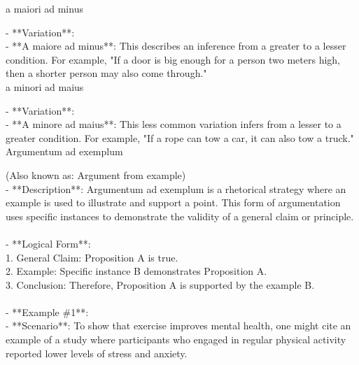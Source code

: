 \documentclass[a4paper,12pt,single,pdftex]{scrbook}
\begin{document}
a maiori ad minus
    
      - **Variation**:
    \\

    
        - **A maiore ad minus**: This describes an inference from a greater to a lesser condition. For example, "If a door is big enough for a person two meters high, then a shorter person may also come through."
    \\

  

a minori ad maius
    
      - **Variation**:
    \\

    
        - **A minore ad maius**: This less common variation infers from a lesser to a greater condition. For example, "If a rope can tow a car, it can also tow a truck."
    \\

  

Argumentum ad exemplum
    
      (Also known as: Argument from example)
    \\

  
    
      - **Description**: Argumentum ad exemplum is a rhetorical strategy where an example is used to illustrate and support a point. This form of argumentation uses specific instances to demonstrate the validity of a general claim or principle.
    \\

    
      
    \\

    
      - **Logical Form**:
    \\

    
        1. General Claim: Proposition A is true.
    \\

    
        2. Example: Specific instance B demonstrates Proposition A.
    \\

    
        3. Conclusion: Therefore, Proposition A is supported by the example B.
    \\

    
      
    \\

    
      - **Example \#1**:
    \\

    
        - **Scenario**: To show that exercise improves mental health, one might cite an example of a study where participants who engaged in regular physical activity reported lower levels of stress and anxiety.
    \\
\end{document}
